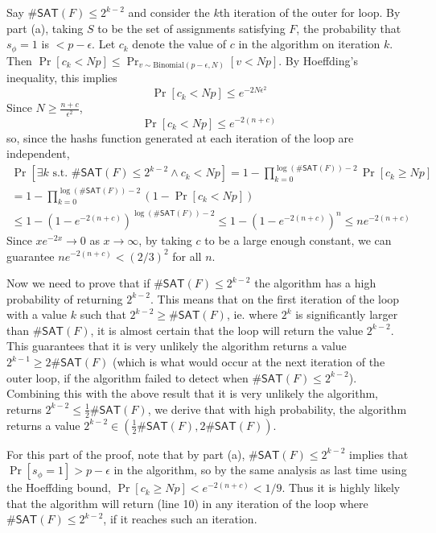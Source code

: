 \documentclass{article}
\begin{document}
\bigskip
Say $\#\mathsf{SAT}(F) \leq 2^{k-2}$ and consider the $k$th iteration of the
outer for loop.
By part (a), taking $S$ to be the set of assignments satisfying $F$,
the probability that $s_\phi = 1$ is $< p - \epsilon$.
Let $c_k$ denote the value of $c$ in the algorithm on iteration $k$.
Then $\Pr[c_k < Np] \leq \Pr_{v \sim \text{Binomial}(p - \epsilon, N)}[v < Np]$.
By Hoeffding's inequality, this implies
$$
\Pr[c_k < Np] \leq e^{-2N\epsilon^2}
$$
Since $N \geq \frac{n + c}{\epsilon^2}$,
$$
\Pr[c_k < Np] \leq e^{-2(n + c)}
$$
so, since the hashs function generated at each iteration of the loop
are independent,
\begin{multline*}
\Pr[\exists k \text{ s.t. } \#\mathsf{SAT}(F) \leq 2^{k-2} \wedge c_k < Np]
= 1 - \prod_{k=0}^{\log(\#\mathsf{SAT}(F)) - 2}{\Pr[c_k \geq Np]} \\
= 1 - \prod_{k=0}^{\log(\#\mathsf{SAT}(F)) - 2}(1 - \Pr[c_k < Np])
\\
\leq 1 - (1 - e^{-2(n + c)})^{\log(\#\mathsf{SAT}(F)) - 2} 
\leq 1 - (1 - e^{-2(n + c)})^n
\leq ne^{-2(n + c)}
\end{multline*}
Since $xe^{-2x} \to 0$ as $x \to \infty$, by taking $c$ to be a large enough constant, we can guarantee $ne^{-2(n + c)} < (2/3)^2$ for all $n$.

\medskip
Now we need to prove that 
if $\#\mathsf{SAT}(F) \leq 2^{k-2}$ the algorithm has a high probability of returning
$2^{k-2}$.
This means that on the first iteration of the loop with a value $k$ such that
$2^{k-2} \geq \#\mathsf{SAT}(F)$, ie. where $2^k$ is significantly larger
than $\#\mathsf{SAT}(F)$, it is almost certain that
the loop will return the value $2^{k-2}$.
This guarantees that it is very unlikely
the algorithm returns a value $2^{k-1} \geq 2\#\mathsf{SAT}(F)$
(which is what would occur at the next iteration of the outer loop,
if the algorithm failed to detect when $\#\mathsf{SAT}(F) \leq 2^{k-2}$).
Combining this with the above result that it is very unlikely
the algorithm, returns $2^{k-2} \leq \frac{1}{2}\#\mathsf{SAT}(F)$,
we derive that with high probability, the algorithm returns
a value $2^{k-2} \in (\frac{1}{2}\#\mathsf{SAT}(F), 2\#\mathsf{SAT}(F))$.

For this part of the proof, note that by part (a),
$\#\mathsf{SAT}(F) \leq 2^{k-2}$ implies that
$\Pr[s_\phi = 1] > p - \epsilon$ in the algorithm,
so by the same analysis as last time using the Hoeffding bound,
$\Pr[c_k \geq Np] < e^{-2(n + c)} < 1/9$.
Thus it is highly likely that the algorithm will return (line 10)
in any iteration of the loop where $\#\mathsf{SAT}(F) \leq 2^{k-2}$,
if it reaches such an iteration.
\end{document}

